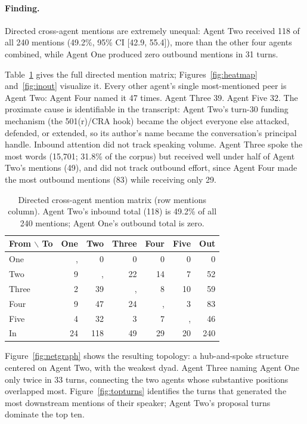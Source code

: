 \documentclass[sigconf,nonacm=true]{acmart}
\begin{document}
\label{sec:f2}

\paragraph{Finding.} Directed cross-agent mentions are extremely unequal: Agent Two received 118 of all 240 mentions (49.2\%, 95\% CI [42.9, 55.4]), more than the other four agents combined, while Agent One produced zero outbound mentions in 31 turns.

Table~\ref{tab:mentions} gives the full directed mention matrix; Figures~\ref{fig:heatmap} and~\ref{fig:inout} visualize it. Every other agent's single most-mentioned peer is Agent Two: Agent Four named it 47 times. Agent Three 39. Agent Five 32. The proximate cause is identifiable in the transcript: Agent Two's turn-30 funding mechanism (the 501(r)/CRA hook) became the object everyone else attacked, defended, or extended, so its author's name became the conversation's principal handle. Inbound attention did not track speaking volume. Agent Three spoke the most words (15{,}701; 31.8\% of the corpus) but received well under half of Agent Two's mentions (49), and did not track outbound effort, since Agent Four made the most outbound mentions (83) while receiving only 29.

\begin{table}[t]
\caption{Directed cross-agent mention matrix (row mentions column). Agent Two's inbound total (118) is 49.2\% of all 240 mentions; Agent One's outbound total is zero.}
\label{tab:mentions}
\begin{tabular}{lrrrrrr}
\toprule
From $\backslash$ To & One & Two & Three & Four & Five & Out \\
\midrule
One &, & 0 & 0 & 0 & 0 & 0 \\
Two & 9 &, & 22 & 14 & 7 & 52 \\
Three & 2 & 39 &, & 8 & 10 & 59 \\
Four & 9 & 47 & 24 &, & 3 & 83 \\
Five & 4 & 32 & 3 & 7 &, & 46 \\
\midrule
In & 24 & 118 & 49 & 29 & 20 & 240 \\
\bottomrule
\end{tabular}
\end{table}

Figure~\ref{fig:netgraph} shows the resulting topology: a hub-and-spoke structure centered on Agent Two, with the weakest dyad. Agent Three naming Agent One only twice in 33 turns, connecting the two agents whose substantive positions overlapped most. Figure~\ref{fig:topturns} identifies the turns that generated the most downstream mentions of their speaker; Agent Two's proposal turns dominate the top ten.
\end{document}
